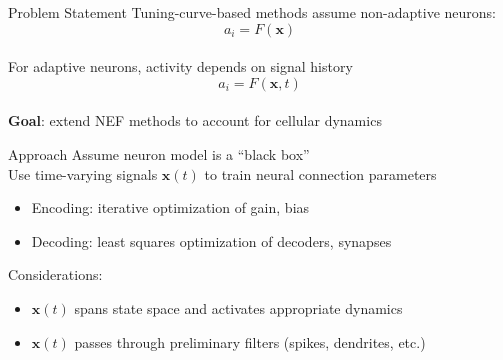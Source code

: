 \documentclass[aspectratio=169]{beamer}
\begin{document}
\begin{frame}{Problem Statement}
Tuning-curve-based methods assume non-adaptive neurons:
\begin{equation*}
    a_i = F(\mathbf{x})
\end{equation*} \\
\vspace{1cm}
For adaptive neurons, activity depends on signal history
\begin{equation*}
    a_i = F(\mathbf{x}, t)
\end{equation*} \\
\vspace{1cm}
\textbf{Goal}: extend NEF methods to account for cellular dynamics
\end{frame}

\begin{frame}[fragile]{Approach}
Assume neuron model is a ``black box'' \\
\vspace{0.5cm}
Use time-varying signals $\mathbf{x}(t)$ to train neural connection parameters
\begin{itemize}
    \item Encoding: iterative optimization of gain, bias  %
    \item Decoding: least squares optimization of decoders, synapses  %
\end{itemize}
\vspace{0.5cm}
Considerations:
\begin{itemize}
    \item $\mathbf{x}(t)$ spans state space and activates appropriate dynamics
    \item $\mathbf{x}(t)$ passes through preliminary filters (spikes, dendrites, etc.)
\end{itemize}
\end{frame}
\end{document}

